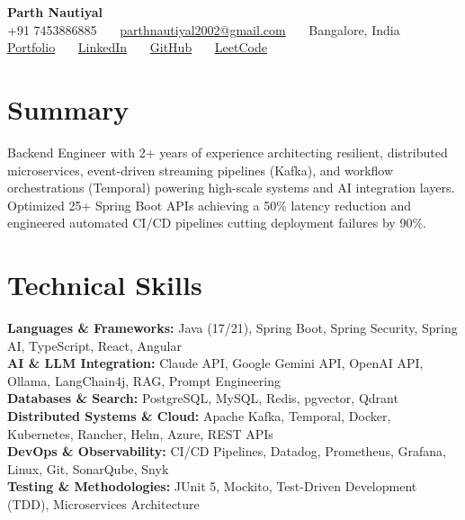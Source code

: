 \documentclass[a4paper,10pt]{article}
\begin{document}
\begin{center}
  \textbf{{\LARGE Parth Nautiyal}} \\ \vspace{2pt}
  \small
  +91 7453886885 \ \textbar\ \ \href{mailto:parthnautiyal2002@gmail.com}{parthnautiyal2002@gmail.com} \ \textbar\ \ Bangalore, India \\ \vspace{1pt}
  \href{https://parthnautiyal.vercel.app/}{Portfolio} \ \textbar\ \ 
  \href{https://linkedin.com/in/parthnautiyal}{LinkedIn} \ \textbar\ \ 
  \href{https://github.com/parthnautiyal}{GitHub} \ \textbar\ \ 
  \href{https://leetcode.com/u/parth_nautiyal/}{LeetCode}
\end{center}

\vspace{-4pt}
\section*{Summary}
\vspace{1pt}
\begin{small}
Backend Engineer with 2+ years of experience architecting resilient, distributed microservices, event-driven streaming pipelines (Kafka), and workflow orchestrations (Temporal) powering high-scale systems and AI integration layers. Optimized 25+ Spring Boot APIs achieving a 50\% latency reduction and engineered automated CI/CD pipelines cutting deployment failures by 90\%.
\end{small}

\vspace{1pt}
\section{Technical Skills}
\begin{itemize}[leftmargin=0.15in, label={}]
  \small{\item{
    \textbf{Languages \& Frameworks:}{ Java (17/21), Spring Boot, Spring Security, Spring AI, TypeScript, React, Angular} \\ \vspace{1pt}
    \textbf{AI \& LLM Integration:}{ Claude API, Google Gemini API, OpenAI API, Ollama, LangChain4j, RAG, Prompt Engineering} \\ \vspace{1pt}
    \textbf{Databases \& Search:}{ PostgreSQL, MySQL, Redis, pgvector, Qdrant} \\ \vspace{1pt}
    \textbf{Distributed Systems \& Cloud:}{ Apache Kafka, Temporal, Docker, Kubernetes, Rancher, Helm, Azure, REST APIs} \\ \vspace{1pt}
    \textbf{DevOps \& Observability:}{ CI/CD Pipelines, Datadog, Prometheus, Grafana, Linux, Git, SonarQube, Snyk} \\ \vspace{1pt}
    \textbf{Testing \& Methodologies:}{ JUnit 5, Mockito, Test-Driven Development (TDD), Microservices Architecture}
  }}
\end{itemize}
\vspace{-6pt}
\end{document}
